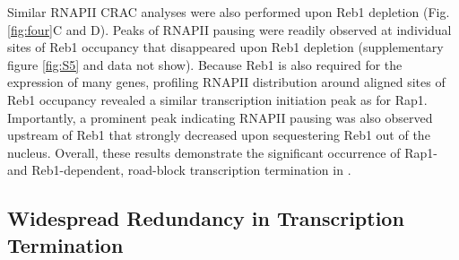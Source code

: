 Similar RNAPII CRAC analyses were also performed upon Reb1 depletion (Fig. \ref{fig:four}C and D). Peaks of RNAPII pausing were readily observed at individual sites of Reb1 occupancy that disappeared upon Reb1 depletion (supplementary figure \ref{fig:S5} and data not show). Because Reb1 is also required for the expression of many genes, profiling RNAPII distribution around aligned sites of Reb1 occupancy revealed a similar transcription initiation peak as for Rap1.  Importantly, a prominent peak indicating RNAPII pausing was also observed upstream of Reb1 that strongly decreased upon sequestering Reb1 out of the nucleus. Overall, these results demonstrate the significant occurrence of Rap1- and Reb1-dependent, road-block transcription termination in \cer{}.





\singlespacing
\subsection*{Widespread Redundancy in Transcription Termination}
\doublespacing

